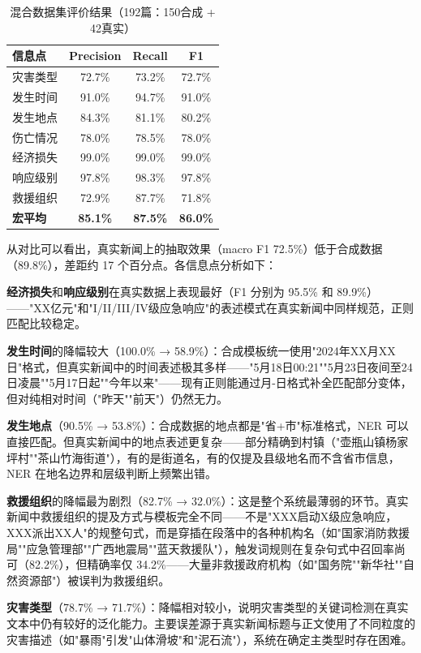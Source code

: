 \documentclass[12pt, a4paper]{ctexart}
\begin{document}
\begin{table}[H]
\centering
\caption{混合数据集评价结果（192篇：150合成 + 42真实）}
\label{tab:eval_all}
\begin{tabular}{lccc}
\toprule
\textbf{信息点} & \textbf{Precision} & \textbf{Recall} & \textbf{F1} \\
\midrule
灾害类型 & 72.7\% & 73.2\% & 72.7\% \\
发生时间 & 91.0\% & 94.7\% & 91.0\% \\
发生地点 & 84.3\% & 81.1\% & 80.2\% \\
伤亡情况 & 78.0\% & 78.5\% & 78.0\% \\
经济损失 & 99.0\% & 99.0\% & 99.0\% \\
响应级别 & 97.8\% & 98.3\% & 97.8\% \\
救援组织 & 72.9\% & 87.7\% & 71.8\% \\
\midrule
\textbf{宏平均} & \textbf{85.1\%} & \textbf{87.5\%} & \textbf{86.0\%} \\
\bottomrule
\end{tabular}
\end{table}

从对比可以看出，真实新闻上的抽取效果（macro F1 72.5\%）低于合成数据（89.8\%），差距约 17 个百分点。各信息点分析如下：

\textbf{经济损失}和\textbf{响应级别}在真实数据上表现最好（F1 分别为 95.5\% 和 89.9\%）——"XX亿元"和"I/II/III/IV级应急响应"的表述模式在真实新闻中同样规范，正则匹配比较稳定。

\textbf{发生时间}的降幅较大（100.0\% → 58.9\%）：合成模板统一使用"2024年XX月XX日"格式，但真实新闻中的时间表述极其多样——"5月18日00:21""5月23日夜间至24日凌晨""5月17日起""今年以来"——现有正则能通过月-日格式补全匹配部分变体，但对纯相对时间（"昨天""前天"）仍然无力。

\textbf{发生地点}（90.5\% → 53.8\%）：合成数据的地点都是"省+市"标准格式，NER 可以直接匹配。但真实新闻中的地点表述更复杂——部分精确到村镇（"壶瓶山镇杨家坪村""茶山竹海街道"），有的是街道名，有的仅提及县级地名而不含省市信息，NER 在地名边界和层级判断上频繁出错。

\textbf{救援组织}的降幅最为剧烈（82.7\% → 32.0\%）：这是整个系统最薄弱的环节。真实新闻中救援组织的提及方式与模板完全不同——不是"XXX启动X级应急响应，XXX派出XX人"的规整句式，而是穿插在段落中的各种机构名（如"国家消防救援局""应急管理部""广西地震局""蓝天救援队"），触发词规则在复杂句式中召回率尚可（82.2\%），但精确率仅 34.2\%——大量非救援政府机构（如"国务院""新华社""自然资源部"）被误判为救援组织。

\textbf{灾害类型}（78.7\% → 71.7\%）：降幅相对较小，说明灾害类型的关键词检测在真实文本中仍有较好的泛化能力。主要误差源于真实新闻标题与正文使用了不同粒度的灾害描述（如"暴雨"引发"山体滑坡"和"泥石流"），系统在确定主类型时存在困难。
\end{document}
